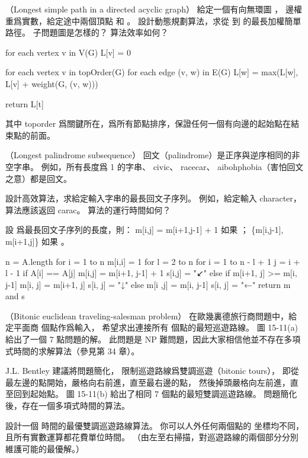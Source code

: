 \startsubject[
  title={Problems},
]

\startPROBLEM
（Longest simple path in a directed acyclic graph）
給定一個有向無環圖 ，
邊權重爲實數，給定途中兩個頂點  和 。
設計動態規劃算法，求從  到  的最長加權簡單路徑。
子問題圖是怎樣的？
算法效率如何？
\stopPROBLEM

\startANSWER
{}
\startCLRS
for each vertex v in V(G)
	L[v] = 0

for each vertex v in topOrder(G)
	for each edge (v, w) in E(G)
		L[w] = max(L[w], L[v] + weight(G, (v, w)))

return L[t]
\stopCLRS

其中 toporder 爲關鍵所在，爲所有節點排序，保證任何一個有向邊的起始點在結束點的前面。
\stopANSWER

\startPROBLEM
（Longest palindrome subsequence）
{\EMP 回文}（palindrome）是正序與逆序相同的非空字串。
例如，所有長度爲 1 的字串、 civic、 racecar、 aibohphobia（害怕回文之意）都是回文。

設計高效算法，求給定輸入字串的最長回文子序列。
例如，給定輸入 character，算法應該返回 carac。
算法的運行時間如何？
\stopPROBLEM

\startANSWER
設  爲最長回文子序列的長度，則：
\startformula
m[i,j] = \startcases
\NC m[i+1,j-1] + 1 \NC 如果 ； \NR
\NC \max\{m[i,j-1], m[i+1,j]\} \NC 如果 。 \NR
\stopcases
\stopformula

\startCLRS
n = A.length
for i = 1 to n
	m[i,i] = 1
for l = 2 to n
	for i = 1 to n - l + 1
		j = i + l - 1
		if A[i] == A[j]
			m[i,j] = m[i+1, j-1] + 1
			s[i,j] = "↙"
		else if m[i+1, j] >= m[i, j-1]
			m[i, j] = m[i+1, j]
			s[i, j] = "↓"
		else
			m[i ,j] = m[i, j-1]
			s[i, j] = "←"
return m and s
\stopCLRS
\stopANSWER

\startPROBLEM[problem:15-3]
（Bitonic euclidean traveling-salesman problem）
在{\EMP 歐幾裏德旅行商}問題中，給定平面商  個點作爲輸入，
希望求出連接所有  個點的最短巡遊路線。
圖 15-11(a) 給出了一個 7 點問題的解。
此問題是 NP 難問題，因此大家相信他並不存在多項式時間的求解算法（參見第 34 章）。

J.L. Bentley 建議將問題簡化，
限制巡遊路線爲{\EMP 雙調巡遊}（bitonic tours），
即從最左邊的點開始，嚴格向右前進，直至最右邊的點，
然後掉頭嚴格向左前進，直至回到起始點。
圖 15-11(b) 給出了相同 7 個點的最短雙調巡遊路線。
問題簡化後，存在一個多項式時間的算法。

設計一個  時間的最優雙調巡遊路線算法。
你可以人外任何兩個點的  坐標均不同，
且所有實數運算都花費單位時間。
（\hint 由左至右掃描，對巡遊路線的兩個部分分別維護可能的最優解。）
\stopPROBLEM

